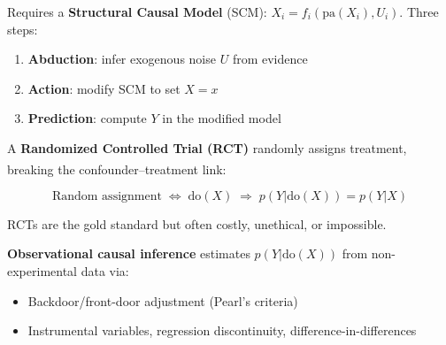 \begin{tcbitemize}[ skin=sectionraster ]
    Requires a \textbf{Structural Causal Model} (SCM):
    $X_i = f_i(\mathrm{pa}(X_i), U_i)$.
    Three steps:
    \begin{enumerate}
        \item \textbf{Abduction}: infer exogenous noise $U$ from evidence
        \item \textbf{Action}: modify SCM to set $X{=}x$
        \item \textbf{Prediction}: compute $Y$ in the modified model
    \end{enumerate}

    \tcbitem[title={Causal Inference vs RCTs}, raster multicolumn=3]
    A \textbf{Randomized Controlled Trial (RCT)} randomly assigns treatment,
    breaking the confounder--treatment
    link:\textsuperscript{\cite[][Ch.~1]{hernanCausalInferenceWhat2020}}

    \[ \text{Random assignment} \;\Leftrightarrow\; \mathrm{do}(X)
       \;\Rightarrow\; p(Y|\mathrm{do}(X)) = p(Y|X) \]

    RCTs are the gold standard but often costly, unethical, or impossible.

    \textbf{Observational causal inference} estimates $p(Y|\mathrm{do}(X))$
    from non-experimental data via:
    \begin{itemize}
        \item Backdoor/front-door adjustment (Pearl’s criteria)
        \item Instrumental variables, regression discontinuity,
              difference-in-differences
    \end{itemize}

    \end{tcbitemize}

